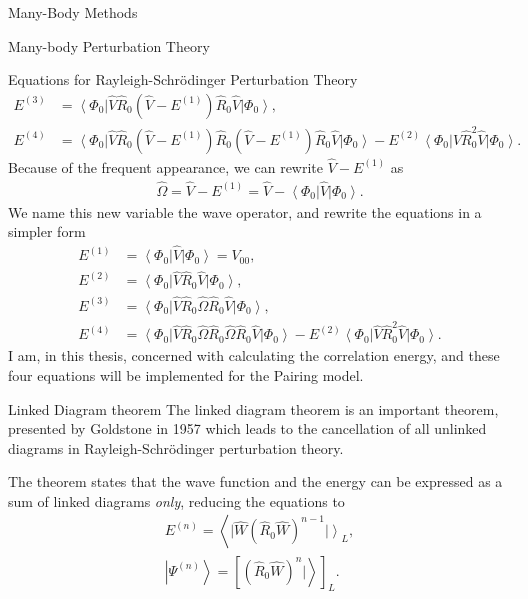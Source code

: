\documentclass[twoside,english]{uiofysmaster}
\begin{document}
\begin{chapter}{Many-Body Methods}
\begin{section}{Many-body Perturbation Theory}
\begin{subsection}{Equations for Rayleigh-Schr\"{o}dinger Perturbation Theory}
\begin{align*}
	 			E^{(3)} &= \left< \Phi_0 \right| \hat V \hat R_0 (\hat V - E^{(1)})  \hat R_0 \hat V \left| \Phi_0 \right>, \\
	 			E^{(4)} &= \left< \Phi_0 \right| \hat V \hat R_0 (\hat V - E^{(1)})  \hat R_0 (\hat V - E^{(1)}) \hat R_0 \hat V \left| \Phi_0 \right> 
	 					- E^{(2)} \left< \Phi_0 \right| \hat V \hat R_0^2 \hat V \left| \Phi_0 \right>.
	  		\end{align*}
	  		Because of the frequent appearance, we can rewrite $\hat V - E^{(1)}$ as
	  		\begin{align}
	  			\hat \Omega = \hat V - E^{(1)} = \hat V - \left< \Phi_0 \right| \hat V \left| \Phi_0 \right>.
	  		\end{align}
	  		We name this new variable the wave operator, and rewrite the equations in a simpler form 
	  		\begin{align*}
	 			E^{(1)} &= \left< \Phi_0 \right| \hat V \left| \Phi_0 \right>  = V_{00},\\
	 			E^{(2)} &= \left< \Phi_0 \right| \hat V \hat R_0 \hat V \left| \Phi_0 \right>, \\
	 			E^{(3)} &= \left< \Phi_0 \right| \hat V \hat R_0 \hat \Omega \hat R_0 \hat V \left| \Phi_0 \right>, \\
	 			E^{(4)} &= \left< \Phi_0 \right| \hat V \hat R_0 \hat \Omega  \hat R_0 \hat \Omega \hat R_0 \hat V \left| \Phi_0 \right> 
	 					- E^{(2)} \left< \Phi_0 \right| \hat V \hat R_0^2 \hat V \left| \Phi_0 \right>.
	 			\label{MBPT equations}
	  		\end{align*}
	  		I am, in this thesis, concerned with calculating the correlation energy, and these four equations will be implemented for the Pairing model. 
	 	\end{subsection}
	\end{section}

	\begin{section}{Linked Diagram theorem}
		The linked diagram theorem is an important theorem, presented by Goldstone in 1957 \cite{ShavittAndBartlett,Goldstone} which leads to the cancellation of all unlinked diagrams in Rayleigh-Schr\"{o}dinger perturbation theory.

		The theorem states that the wave function and the energy can be expressed as a sum of linked diagrams \textit{only}, reducing the equations to 
		\begin{align}
			E^{(n)} = \left< \right. | \hat W (\hat R_0 \hat W)^{n-1} \left. | \right>_L, \\
			\left| \Psi^{(n)} \right> = \left[ (\hat R_0 \hat W)^n |\left.\right>  \right]_L.
		\end{align}


\end{section}
\end{chapter}
\end{document}
